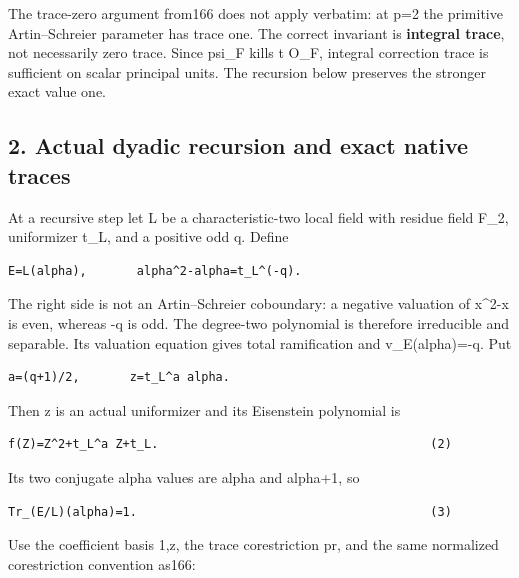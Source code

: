 The trace-zero argument from166 does not apply verbatim: at p=2 the
primitive Artin--Schreier parameter has trace one. The correct invariant
is \textbf{integral trace}, not necessarily zero trace. Since psi\_F
kills t O\_F, integral correction trace is sufficient on scalar
principal units. The recursion below preserves the stronger exact value
one.

\hypertarget{dyadic_character-actual-dyadic-recursion-and-exact-native-traces}{%
\subsection{2. Actual dyadic recursion and exact native
traces}\label{dyadic_character-actual-dyadic-recursion-and-exact-native-traces}}

At a recursive step let L be a characteristic-two local field with
residue field F\_2, uniformizer t\_L, and a positive odd q. Define

\begin{Verbatim}[fontsize=\small,breaklines=true,breakanywhere=true]
E=L(alpha),       alpha^2-alpha=t_L^(-q).
\end{Verbatim}

The right side is not an Artin--Schreier coboundary: a negative
valuation of x\^{}2-x is even, whereas -q is odd. The degree-two
polynomial is therefore irreducible and separable. Its valuation
equation gives total ramification and v\_E(alpha)=-q. Put

\begin{Verbatim}[fontsize=\small,breaklines=true,breakanywhere=true]
a=(q+1)/2,       z=t_L^a alpha.
\end{Verbatim}

Then z is an actual uniformizer and its Eisenstein polynomial is

\begin{Verbatim}[fontsize=\small,breaklines=true,breakanywhere=true]
f(Z)=Z^2+t_L^a Z+t_L.                                      (2)
\end{Verbatim}

Its two conjugate alpha values are alpha and alpha+1, so

\begin{Verbatim}[fontsize=\small,breaklines=true,breakanywhere=true]
Tr_(E/L)(alpha)=1.                                         (3)
\end{Verbatim}

Use the coefficient basis 1,z, the trace corestriction pr, and the same
normalized corestriction convention as166:


